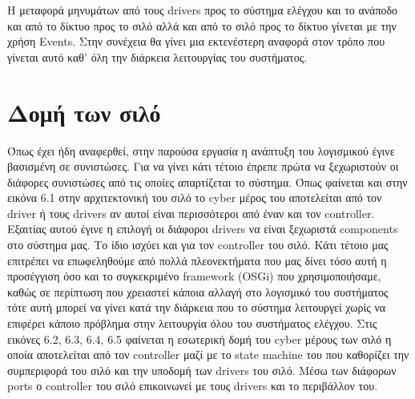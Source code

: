	Η μεταφορά μηνυμάτων από τους drivers προς το σύστημα ελέγχου και το ανάποδο και από το δίκτυο προς το σιλό αλλά και από το σιλό προς το δίκτυο γίνεται με την χρήση Events. Στην συνέχεια θα γίνει μια εκτενέστερη αναφορά στον τρόπο που γίνεται αυτό καθ’ όλη την διάρκεια λειτουργίας του συστήματος. 
	
\section{Δομή των σιλό}

Όπως έχει ήδη αναφερθεί, στην παρούσα εργασία η ανάπτυξη του λογισμικού έγινε  βασισμένη σε συνιστώσες. Για να γίνει κάτι τέτοιο έπρεπε πρώτα να ξεχωριστούν οι διάφορες συνιστώσες από τις οποίες απαρτίζεται το σύστημα. Όπως φαίνεται και στην εικόνα 6.1 στην αρχιτεκτονική του σιλό το cyber μέρος του αποτελείται από τον driver ή τους drivers αν αυτοί είναι περισσότεροι από έναν και τον controller. Εξαιτίας αυτού έγινε η επιλογή οι διάφοροι drivers να είναι ξεχωριστά components στο σύστημα μας. Το ίδιο ισχύει και για τον controller του σιλό. Κάτι τέτοιο μας επιτρέπει να επωφεληθούμε από πολλά πλεονεκτήματα που μας δίνει τόσο αυτή η προσέγγιση όσο και το συγκεκριμένο framework (OSGi) που χρησιμοποιήσαμε, καθώς σε περίπτωση που χρειαστεί κάποια αλλαγή στο λογισμικό του συστήματος τότε αυτή μπορεί να γίνει κατά την διάρκεια που το σύστημα λειτουργεί χωρίς να επιφέρει κάποιο πρόβλημα στην λειτουργία όλου του συστήματος ελέγχου. Στις εικόνες 6.2, 6.3, 6.4, 6.5 φαίνεται η εσωτερική δομή του cyber μέρους των σιλό η οποία αποτελείται από τον controller μαζί με το state machine του που καθορίζει την συμπεριφορά του σιλό και την υποδομή των drivers του σιλό. Μέσω των διάφορων ports ο controller του σιλό επικοινωνεί με τους drivers και το περιβάλλον του.  

